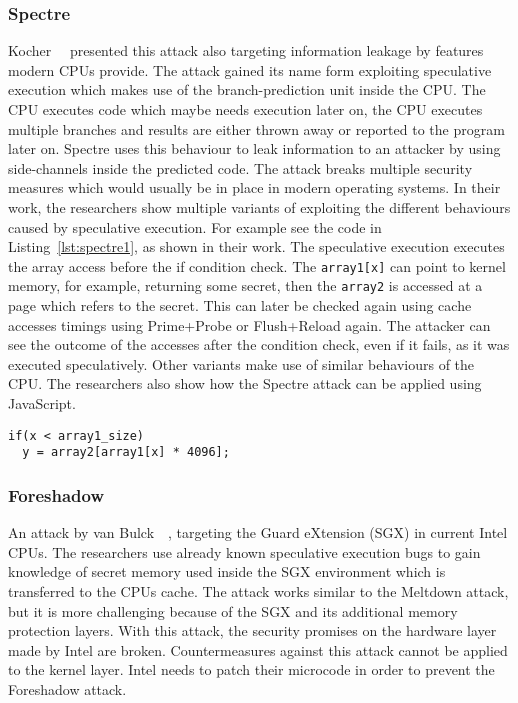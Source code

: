 \subsubsection{Spectre}

Kocher~\etal~\cite{spectre} presented this attack also targeting information
leakage by features modern CPUs provide. The attack gained its name form
exploiting speculative execution which makes use of the branch-prediction unit
inside the CPU. The CPU executes code which maybe needs execution later on,
the CPU executes multiple branches and results are either thrown away or
reported to the program later on. Spectre uses this behaviour to leak
information to an attacker by using side-channels inside the predicted code.
The attack breaks multiple security measures which would usually be in place in
modern operating systems. In their work, the researchers show multiple variants
of exploiting the different behaviours caused by speculative execution. For
example see the code in Listing~\ref{lst:spectre1}, as shown in their work. The
speculative execution executes the array access before the if condition check.
The \texttt{array1[x]} can point to kernel memory, for example, returning some
secret, then the \texttt{array2} is accessed at a page which refers to the
secret. This can later be checked again using cache accesses timings using
Prime+Probe or Flush+Reload again. The attacker can see the outcome of the
accesses after the condition check, even if it fails, as it was executed
speculatively. Other variants make use of similar behaviours of the CPU. The
researchers also show how the Spectre attack can be applied using JavaScript.

\begin{minipage}{\linewidth}
\begin{lstlisting}[style=CStyle,
                   caption={Code for Spectre variant one, showing a
conditional branch example, as seen by the work done by
Kocher~\etal~\cite{spectre}.},
                   label={lst:spectre1}]
if(x < array1_size)
  y = array2[array1[x] * 4096];
\end{lstlisting}
\end{minipage}

\subsubsection{Foreshadow}

An attack by van Bulck~\etal~\cite{foreshadow}, targeting the Guard eXtension
(SGX) in current Intel CPUs. The researchers use already known speculative
execution bugs to gain knowledge of secret memory used inside the SGX
environment which is transferred to the CPU\textquotesingle s cache. The attack
works similar to the Meltdown attack, but it is more challenging because of the
SGX and its additional memory protection layers. With this attack, the security
promises on the hardware layer made by Intel are broken. Countermeasures
against this attack cannot be applied to the kernel layer. Intel needs to patch
their microcode in order to prevent the Foreshadow attack.

